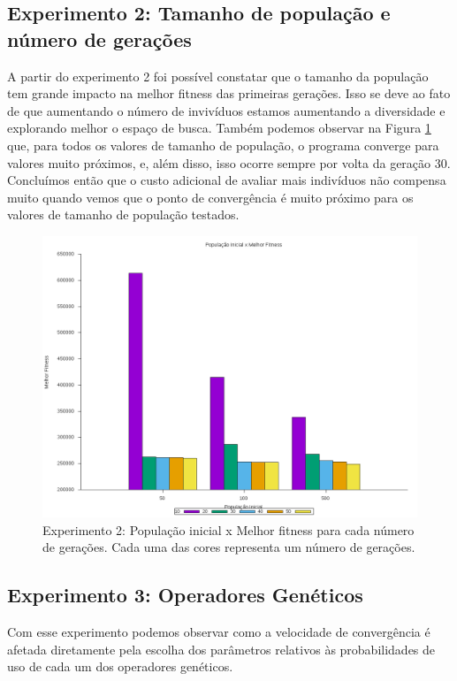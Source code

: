 \documentclass[12pt]{article}
\begin{document}
\subsection{Experimento 2: Tamanho de população e número de gerações}

A partir do experimento 2 foi possível constatar que o tamanho da população tem grande impacto
na melhor fitness das primeiras gerações. Isso se deve ao fato de que aumentando o número de
invivíduos estamos aumentando a diversidade e explorando melhor o espaço de busca. Também
podemos observar na Figura \ref{fig:exp2h} que, para todos os valores de tamanho de população,
o programa converge para valores muito próximos, e, além disso, isso ocorre sempre por volta da 
geração 30. Concluímos então que o custo adicional de avaliar mais indivíduos não compensa muito
quando vemos que o ponto de convergência é muito próximo para os valores de tamanho de população
testados.

\begin{figure}[ht]
  \centering
  \includegraphics[width=1\textwidth]{exp2h.png}
  \caption{Experimento 2: População inicial x Melhor fitness para cada número de gerações.
  Cada uma das cores representa um número de gerações.}
  \label{fig:exp2h}
\end{figure}

\subsection{Experimento 3: Operadores Genéticos}

Com esse experimento podemos observar como a velocidade de convergência é afetada diretamente pela
escolha dos parâmetros relativos às probabilidades de uso de cada um dos operadores genéticos.
\end{document}
